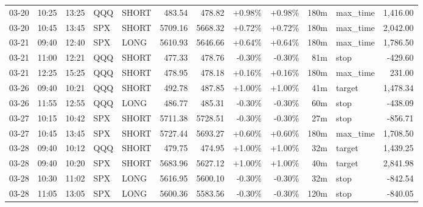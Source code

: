 \documentclass[11pt,a4paper,twoside]{article}
\begin{document}
\begin{center}
\begin{longtable}{>{\color{txtmain}}l l l l l r r r r r >{\color{txtmain}}l r}
03-20 & 10:25 & 13:25 & QQQ & SHORT & 483.54 & 478.82 & \textcolor{wingreen}{+0.98\%} & \textcolor{wingreen}{+0.98\%} & 180m & max\_time & \textcolor{wingreen}{1,416.00} \\
03-20 & 10:45 & 13:45 & SPX & SHORT & 5709.16 & 5668.32 & \textcolor{wingreen}{+0.72\%} & \textcolor{wingreen}{+0.72\%} & 180m & max\_time & \textcolor{wingreen}{2,042.00} \\
03-21 & 09:40 & 12:40 & SPX & LONG & 5610.93 & 5646.66 & \textcolor{wingreen}{+0.64\%} & \textcolor{wingreen}{+0.64\%} & 180m & max\_time & \textcolor{wingreen}{1,786.50} \\
03-21 & 11:00 & 12:21 & QQQ & SHORT & 477.33 & 478.76 & \textcolor{lossred}{-0.30\%} & \textcolor{lossred}{-0.30\%} & 81m & stop & \textcolor{lossred}{-429.60} \\
03-21 & 12:25 & 15:25 & QQQ & SHORT & 478.95 & 478.18 & \textcolor{wingreen}{+0.16\%} & \textcolor{wingreen}{+0.16\%} & 180m & max\_time & \textcolor{wingreen}{231.00} \\
03-26 & 09:40 & 10:21 & QQQ & SHORT & 492.78 & 487.85 & \textcolor{wingreen}{+1.00\%} & \textcolor{wingreen}{+1.00\%} & 41m & target & \textcolor{wingreen}{1,478.34} \\
03-26 & 11:55 & 12:55 & QQQ & LONG & 486.77 & 485.31 & \textcolor{lossred}{-0.30\%} & \textcolor{lossred}{-0.30\%} & 60m & stop & \textcolor{lossred}{-438.09} \\
03-27 & 10:15 & 10:42 & SPX & SHORT & 5711.38 & 5728.51 & \textcolor{lossred}{-0.30\%} & \textcolor{lossred}{-0.30\%} & 27m & stop & \textcolor{lossred}{-856.71} \\
03-27 & 10:45 & 13:45 & SPX & SHORT & 5727.44 & 5693.27 & \textcolor{wingreen}{+0.60\%} & \textcolor{wingreen}{+0.60\%} & 180m & max\_time & \textcolor{wingreen}{1,708.50} \\
03-28 & 09:40 & 10:12 & QQQ & SHORT & 479.75 & 474.95 & \textcolor{wingreen}{+1.00\%} & \textcolor{wingreen}{+1.00\%} & 32m & target & \textcolor{wingreen}{1,439.25} \\
03-28 & 09:40 & 10:20 & SPX & SHORT & 5683.96 & 5627.12 & \textcolor{wingreen}{+1.00\%} & \textcolor{wingreen}{+1.00\%} & 40m & target & \textcolor{wingreen}{2,841.98} \\
03-28 & 10:30 & 11:02 & SPX & LONG & 5616.95 & 5600.10 & \textcolor{lossred}{-0.30\%} & \textcolor{lossred}{-0.30\%} & 32m & stop & \textcolor{lossred}{-842.54} \\
03-28 & 11:05 & 13:05 & SPX & LONG & 5600.36 & 5583.56 & \textcolor{lossred}{-0.30\%} & \textcolor{lossred}{-0.30\%} & 120m & stop & \textcolor{lossred}{-840.05} \\

\end{longtable}
\end{center}
\end{document}
